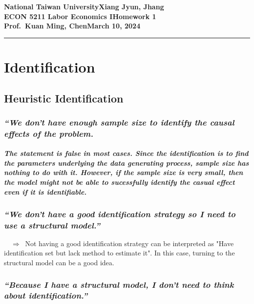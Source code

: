 \documentclass[11pt]{article}
\newcommand{\myname}{Xiang Jyun, Jhang}
\newcommand{\assignment}{Homework 1}
\newcommand{\duedate}{March 10, 2024}
\begin{document}
\textbf{National Taiwan University}\hfill\textbf{\myname}\\[0.01in]
\textbf{ECON 5211 Labor Economics I}\hfill\textbf{\assignment}\\[0.01in]
\textbf{Prof.\ Kuan Ming, Chen}\hfill\textbf{\duedate}\\
\smallskip\hrule\bigskip



\section{Identification}

    \subsection{Heuristic Identification}
    
        

            \subsubsection{\textit{“We don't have enough sample size to identify the causal effects of the problem.}}
            
                \subparagraph{
                The statement is false in most cases. Since the identification is to find the parameters underlying the data generating process, sample size has nothing to do with it. However, if the sample size is very small, then the model might not be able to sucessfully identify the casual effect even if it is identifiable.}
            
            \subsubsection{\textit{“We don't have a good identification strategy so I need to use a structural model.”}}
            
            $\quad\Rightarrow\ $ Not having a good identification strategy can be interpreted as "Have identification set but lack method to estimate it". In this case, turning to the structural model can be a good idea.
            
            \subsubsection{\textit{“Because I have a structural model, I don't need to think about identification.”}}
            
\end{document}
